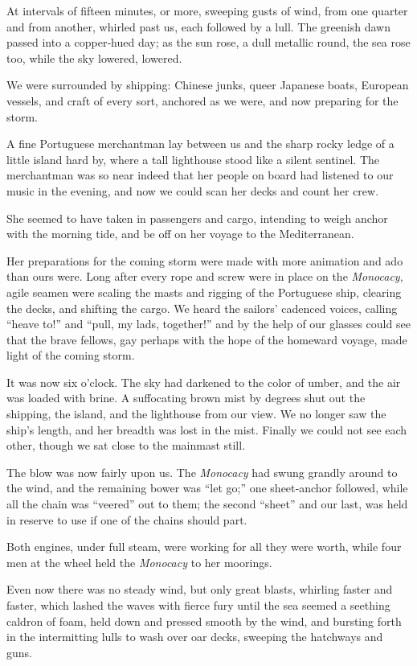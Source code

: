 \documentclass[12pt]{book}
\begin{document}
At intervals of fifteen minutes, or more, sweeping gusts of wind, from one
quarter and from another, whirled past us, each followed by a lull. The greenish
dawn passed into a copper‐hued day; as the sun rose, a dull metallic round, the
sea rose too, while the sky lowered, lowered.

We were surrounded by shipping: Chinese junks, queer Japanese boats, European vessels, and craft of every sort, anchored as we were, and now preparing for
the storm.

A fine Portuguese merchantman lay between us and the sharp rocky ledge
of a little island hard by, where a tall lighthouse stood like a silent sentinel. The
merchantman was so near indeed that her people on board had listened to our
music in the evening, and now we could scan her decks and count her crew.

She seemed to have taken in passengers and cargo, intending to weigh anchor
with the morning tide, and be off on her voyage to the Mediterranean.

Her preparations for the coming storm were made with more animation
and ado than ours were. Long after every rope and screw were in place on the
{\it Monocacy}, agile seamen were scaling the masts and rigging of the Portuguese ship,
clearing the decks, and shifting the cargo. We heard the sailors’ cadenced voices,
calling “heave to!” and “pull, my lads, together!” and by the help of our glasses
could see that the brave fellows, gay perhaps with the hope of the homeward
voyage, made light of the coming storm.

It was now six o’clock. The sky had darkened to the color of umber, and the
air was loaded with brine. A suffocating brown mist by degrees shut out the
shipping, the island, and the lighthouse from our view. We no longer saw the
ship’s length, and her breadth was lost in the mist. Finally we could not see each
other, though we sat close to the mainmast still.

The blow was now fairly upon us. The {\it Monocacy} had swung grandly around
to the wind, and the remaining bower was “let go;” one sheet‐anchor followed,
while all the chain was “veered” out to them; the second “sheet” and our last, was
held in reserve to use if one of the chains should part.

Both engines, under full steam, were working for all they were worth, while
four men at the wheel held the {\it Monocacy} to her moorings.

Even now there was no steady wind, but only great blasts, whirling faster and
faster, which lashed the waves with fierce fury until the sea seemed a seething
caldron of foam, held down and pressed smooth by the wind, and bursting forth
in the intermitting lulls to wash over oar decks, sweeping the hatchways and
guns.
\end{document}

